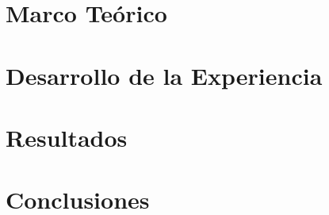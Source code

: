 \documentclass[12pt]{article}
\begin{document}
\newpage
\section{Marco Teórico}



\newpage
\section{Desarrollo de la Experiencia}


\section{Resultados}


\newpage
\section{Conclusiones}




%
%
\end{document}
